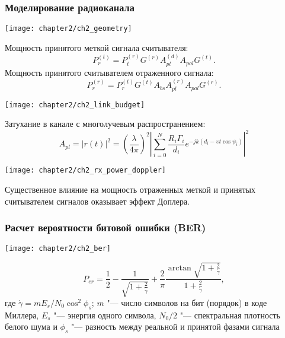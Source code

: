 \begin{frame}[allowframebreaks]
    \frametitle{Моделирование радиоканала}
    \vfill
    \begin{center}
        \texttt{[image: chapter2/ch2\_geometry]}
    \end{center}
    Мощность принятого меткой сигнала считывателя:
    $$
        P_r^{(t)} = P_t^{(r)} G^{(r)} A_{pl}^{(d)} A_{pol} G^{(t)}.
    $$
    Мощность принятого считывателем отраженного сигнала:
    $$
        P_r^{(r)} = P_r^{(t)} G^{(t)} A_{bs} A_{pl}^{(r)} A_{pol} G^{(r)}.
    $$
    \vfill
    \framebreak
    \vfill
    \begin{center}
        \texttt{[image: chapter2/ch2\_link\_budget]}
    \end{center}
    Затухание в канале с многолучевым распространением:
    $$
        A_{pl} = |r(t)|^2 = \left(\frac{\lambda}{4\pi}\right)^2
            \left|\sum\limits_{i=0}^{N} \frac{R_i\Gamma_i}{d_i}
            e^{-jk(d_i-\upsilon t \cos{\psi_i})}\right|^2
    $$
    \vfill
    \framebreak
    \vfill
    \begin{center}
        \texttt{[image: chapter2/ch2\_rx\_power\_doppler]}
    \end{center}
    Существенное влияние на мощность отраженных меткой и принятых считывателем сигналов оказывает эффект Доплера.
    \vfill
  \end{frame}

\begin{frame}
    \frametitle{Расчет вероятности битовой ошибки (BER)}
    \begin{center}
        \texttt{[image: chapter2/ch2\_ber]}
    \end{center}
    $$
	    P_{er} = \frac{1}{2} - \frac{1}{\sqrt{1+\frac{2}{\acute{\gamma}}}} +
		    	 \frac{2}{\pi}\frac{\arctan{\sqrt{1+\frac{2}{\acute{\gamma}}}}}{1+\frac{2}{\acute{\gamma}}},
    $$
    где $\acute{\gamma} = mE_s/N_0\cos^2{\phi_s}$; $m$ "--- число символов на бит (порядок) в коде Миллера, $E_s$ "--- энергия одного символа, $N_0/2$ "--- спектральная плотность белого шума и $\phi_s$ "--- разность между реальной и принятой фазами сигнала
    \vfill
\end{frame}


